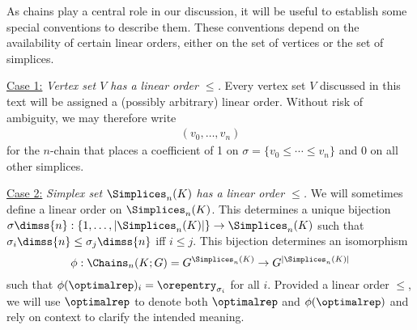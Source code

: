

\begin{remark}
\label{rmk:indexingchains}
As chains play a central role in our discussion, it will be useful to establish some special conventions to describe them.  These conventions depend on the availability of certain linear orders, either on the set of vertices or the set of simplices.

\noindent \underline{Case 1:} \emph{Vertex set $V$ has a linear order $\le$. }  Every vertex set $V$ discussed in this text will be assigned a (possibly arbitrary) linear order.  Without  risk of ambiguity, we may therefore write
    \begin{align*}
        (v_0, \ldots, v_n)
    \end{align*}
for the $n$-chain that places a coefficient of 1 on $\sigma = \{v_0 \leq \cdots \leq v_n\}$ and 0 on all other simplices.%

\noindent \underline{Case 2:} \emph{Simplex set $\Simplices_n(K)$ has a linear order $\le$.}  We will sometimes define a linear order on $\Simplices_n(K)$.  This determines a unique bijection  $\sigma \dimss{n}: \{1, \ldots, |\Simplices_n(K)|\} \to  \Simplices_n(K)$ such that $\sigma_i\dimss{n} \le \sigma_j\dimss{n}$ iff $i \le j$.  This bijection determines an isomorphism
    $$
        \phi: 
        \Chains_n(K;G) = G^{\Simplices_n(K)}
        \to
        G^{|\Simplices_n(K)|}
    $$
such that $\phi(\optimalrep)_i = \orepentry_{\sigma_i}$ for all $i$.  
Provided a linear order $\le$,  we will use $\optimalrep$ to denote both $\optimalrep$ and $\phi(\optimalrep)$ and rely on context to clarify the  intended meaning.
\end{remark}




